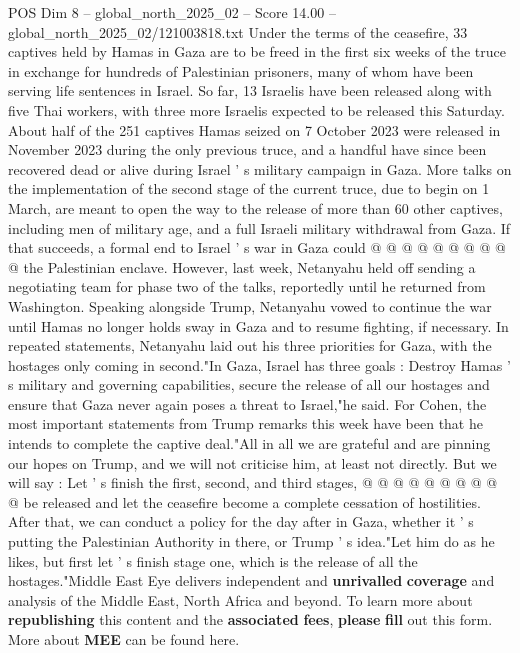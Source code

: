 \begin{textsample}{POS Dim 8 – global\_north\_2025\_02 – Score 14.00 – global\_north\_2025\_02/121003818.txt}
Under the terms of the ceasefire, 33 captives held by Hamas in Gaza are to be freed in the first six weeks of the truce in exchange for hundreds of Palestinian prisoners, many of whom have been serving life sentences in Israel.
So far, 13 Israelis have been released along with five Thai workers, with three more Israelis expected to be released this Saturday.
About half of the 251 captives Hamas seized on 7 October 2023 were released in November 2023 during the only previous truce, and a handful have since been recovered dead or alive during Israel ' s military campaign in Gaza.
More talks on the implementation of the second stage of the current truce, due to begin on 1 March, are meant to open the way to the release of more than 60 other captives, including men of military age, and a full Israeli military withdrawal from Gaza.
If that succeeds, a formal end to Israel ' s war in Gaza could @ @ @ @ @ @ @ @ @ @ the Palestinian enclave.
However, last week, Netanyahu held off sending a negotiating team for phase two of the talks, reportedly until he returned from Washington.
Speaking alongside Trump, Netanyahu vowed to continue the war until Hamas no longer holds sway in Gaza and to resume fighting, if necessary.
In repeated statements, Netanyahu laid out his three priorities for Gaza, with the hostages only coming in second."In Gaza, Israel has three goals : Destroy Hamas ' s military and governing capabilities, secure the release of all our hostages and ensure that Gaza never again poses a threat to Israel,"he said.
For Cohen, the most important statements from Trump remarks this week have been that he intends to complete the captive deal."All in all we are grateful and are pinning our hopes on Trump, and we will not criticise him, at least not directly.
But we will say : Let ' s finish the first, second, and third stages, @ @ @ @ @ @ @ @ @ @ be released and let the ceasefire become a complete cessation of hostilities.
After that, we can conduct a policy for the day after in Gaza, whether it ' s putting the Palestinian Authority in there, or Trump ' s idea."Let him do as he likes, but first let ' s finish stage one, which is the release of all the hostages."Middle East Eye delivers independent and \textbf{unrivalled} \textbf{coverage} and analysis of the Middle East, North Africa and beyond.
To learn more about \textbf{republishing} this content and the \textbf{associated} \textbf{fees}, \textbf{please} \textbf{fill} out this form.
More about \textbf{MEE} can be found here.

\end{textsample}
